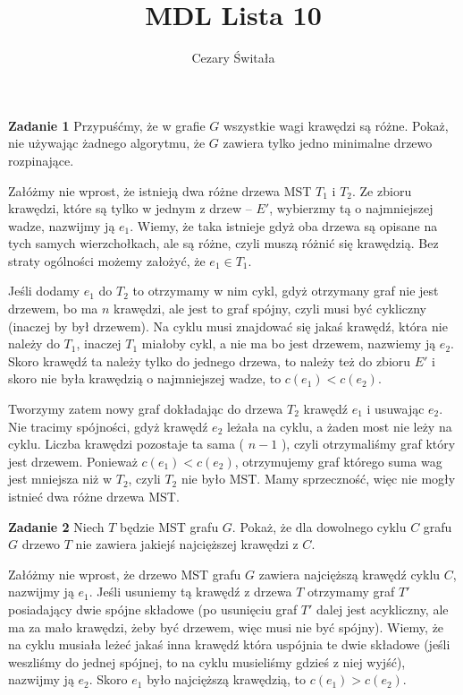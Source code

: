 \documentclass[12pt,a4paper]{article}
\title{MDL Lista 10}
\author{Cezary Świtała}
\begin{document}
\maketitle

\noindent
\textbf{Zadanie 1} Przypuśćmy, że w grafie \(G\) wszystkie wagi krawędzi są różne. Pokaż, nie używając żadnego algorytmu, że \(G\) zawiera tylko jedno minimalne drzewo rozpinające.
\vskip 0.5cm

Załóżmy nie wprost, że istnieją dwa różne drzewa MST \(T_1\) i \(T_2\). Ze zbioru krawędzi, które są tylko w jednym z drzew -- \(E'\), wybierzmy tą o najmniejszej wadze, nazwijmy ją \(e_1\). Wiemy, że taka istnieje gdyż oba drzewa są opisane na tych samych wierzchołkach, ale są różne, czyli muszą różnić się krawędzią. Bez straty ogólności możemy założyć, że \( e_1 \in T_1 \).

Jeśli dodamy \(e_1\) do \(T_2\) to otrzymamy w nim cykl, gdyż otrzymany graf nie jest drzewem, bo ma \(n\) krawędzi, ale jest to graf spójny, czyli musi być cykliczny (inaczej by był drzewem). Na cyklu musi znajdować się jakaś krawędź, która nie należy do \(T_1\), inaczej \(T_1\) miałoby cykl, a nie ma bo jest drzewem, nazwiemy ją \(e_2\). Skoro krawędź ta należy tylko do jednego drzewa, to należy też do zbioru \(E'\) i skoro nie była krawędzią o najmniejszej wadze, to \(c(e_1) < c(e_2)\).

Tworzymy zatem nowy graf dokładając do drzewa \(T_2\) krawędź \(e_1\) i usuwając \(e_2\). Nie tracimy spójności, gdyż krawędź \(e_2\) leżała na cyklu, a żaden most nie leży na cyklu. Liczba krawędzi pozostaje ta sama ( \(n-1\) ), czyli otrzymaliśmy graf który jest drzewem. Ponieważ \(c(e_1) < c(e_2)\), otrzymujemy graf którego suma wag jest mniejsza niż w \(T_2\), czyli \(T_2\) nie było MST. Mamy sprzeczność, więc nie mogły istnieć dwa różne drzewa MST.

\vskip 0.5cm
\noindent
\textbf{Zadanie 2} Niech \(T\) będzie MST grafu \(G\). Pokaż, że dla dowolnego cyklu \(C\) grafu \(G\) drzewo \(T\) nie zawiera jakiejś najcięższej krawędzi z \(C\).
\vskip 0.5cm

Załóżmy nie wprost, że drzewo MST grafu \(G\) zawiera najcięższą krawędź cyklu \(C\), nazwijmy ją \(e_1\). Jeśli usuniemy tą krawędź z drzewa \( T \) otrzymamy graf \( T' \) posiadający dwie spójne składowe (po usunięciu graf \(T'\) dalej jest acykliczny, ale ma za mało krawędzi, żeby być drzewem, więc musi nie być spójny). Wiemy, że na cyklu musiała leżeć jakaś inna krawędź która uspójnia te dwie składowe (jeśli weszliśmy do jednej spójnej, to na cyklu musieliśmy gdzieś z niej  wyjść), nazwijmy ją \(e_2\). Skoro \(e_1\) było najcięższą krawędzią, to \( c(e_1) > c(e_2) \).
\end{document}
